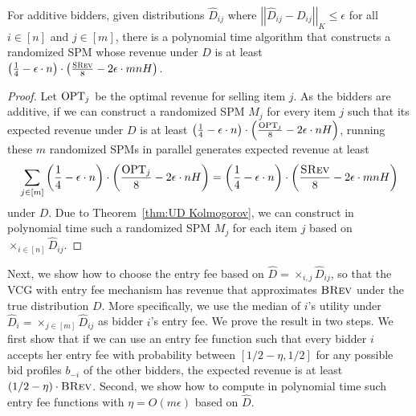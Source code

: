 \begin{lemma}\label{lem:SREV kolmogorov}
	For additive bidders, given distributions $\hat{D}_{ij}$ where $\left|\left|\hat{D}_{ij}-D_{ij}\right|\right|_K\leq \epsilon$ for all $i\in[n]$ and $j\in[m]$, there is a polynomial time algorithm that constructs a randomized SPM whose revenue under $D$ is at least $\left(\frac{1}{4}- \epsilon\cdot n \right)\cdot\left(\frac{\textsc{SRev}}{8}-2\epsilon\cdot mnH\right)$.
\end{lemma}
\begin{proof}
	Let $\text{OPT}_j$ be the optimal revenue for selling item $j$.
	 As the bidders are additive, if we can construct a randomized SPM $M_j$ for every item $j$ such that its expected revenue under $D$ is at least $\left(\frac{1}{4}- \epsilon\cdot n \right)\cdot\left(\frac{\text{OPT}_j}{8}-2\epsilon\cdot nH\right)$, running these $m$ randomized SPMs in parallel generates expected revenue at least $$\sum_{j\in[m]} \left(\frac{1}{4}- \epsilon\cdot n \right)\cdot\left(\frac{\text{OPT}_j}{8}-2\epsilon\cdot nH\right) = \left(\frac{1}{4}- \epsilon\cdot n \right)\cdot\left(\frac{\textsc{SRev}}{8}-2\epsilon\cdot mnH\right)$$ under $D$.
	  Due to Theorem~\ref{thm:UD Kolmogorov}, we can construct in polynomial time such a randomized SPM $M_j$ for each item $j$ based on $\times_{i\in[n]} \hat{D}_{ij}$.
\end{proof}

Next, we show how to choose the entry fee based on $\hat{D} = \times_{i, j} \hat{D}_{ij}$, so that the VCG with entry fee mechanism has revenue that approximates $\textsc{BRev}$ under the true distribution $D$. More specifically, we use the median of $i$'s utility under $\hat{D}_i = \times_{j\in[m]} \hat{D}_{ij}$ as bidder $i$'s entry fee. We prove the result in two steps. We first show that if we can use an entry fee function such that every bidder $i$ accepts her entry fee with probability between $[1/2-\eta,1/2]$ for any possible bid profiles $b_{-i}$ of the other bidders, the expected revenue is at least $(1/2-\eta)\cdot \textsc{BRev}$. Second, we show how to compute in polynomial time such entry fee functions with $\eta=O(m\epsilon)$ based on $\hat{D}$. 

